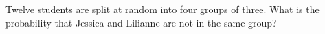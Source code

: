 Twelve students are split at random into four groups of three. What is the probability that Jessica and Lilianne are not in the same group?
